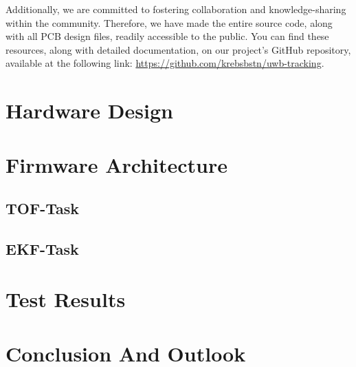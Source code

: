 \documentclass[10pt,a4paper,twocolumn]{article}
\begin{document}
Additionally, we are committed to fostering collaboration and knowledge-sharing
within the community.
Therefore, we have made the entire source code, along with all PCB design files,
readily accessible to the public.
You can find these resources, along with detailed documentation,
on our project's GitHub repository, available at the following link:
\url{https://github.com/krebsbstn/uwb-tracking}.

\section{Hardware Design}\label{section:hardware}
\lipsum[2-4]
\section{Firmware Architecture}\label{section:firmware}
\lipsum[2-4]
\subsection{TOF-Task}\label{section:firmware-tof}
\lipsum[2-4]
\subsection{EKF-Task}\label{section:firmware-ekf}
\lipsum[2-4]
\section{Test Results}\label{section:tests}
\lipsum[2-4]
\section{Conclusion And Outlook}\label{section:conclusion}
\lipsum[2-4]


\end{document}
